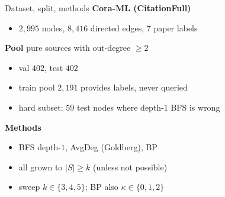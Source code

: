 \documentclass{beamer}
\begin{document}
\begin{frame}{Dataset, split, methods}
  \textbf{Cora-ML (CitationFull)}
  \begin{itemize}
    \item $2{,}995$ nodes, $8{,}416$ directed edges, $7$ paper labels
  \end{itemize}

  \textbf{Pool} pure sources with out-degree $\ge 2$
  \begin{itemize}
    \item val $402$, test $402$
    \item train pool $2{,}191$ provides labels, never queried
    \item hard subset: $59$ test nodes where depth-$1$ BFS is wrong
  \end{itemize}

  \textbf{Methods}
  \begin{itemize}
    \item BFS depth-$1$, AvgDeg (Goldberg), BP
    \item all grown to $|S| \ge k$ (unless not possible)
    \item sweep $k \in \{3, 4, 5\}$; BP also $\kappa \in \{0, 1, 2\}$
  \end{itemize}
\end{frame}
\end{document}
